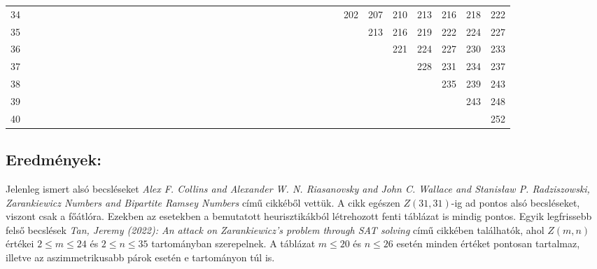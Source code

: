 \documentclass[12pt,a4paper]{article}
\begin{document}
\begin{center}
{\begin{tabular}{r|*{39}{c}}
34 &   &   &   &   &   &   &   &   &   &   &   &   &   &   &   &   &   &   &   &   &   &   &   &   &   &   &   &   &   &   &   &   & 202 & 207 & 210 & 213 & 216 & 218 & 222 \\
35 &   &   &   &   &   &   &   &   &   &   &   &   &   &   &   &   &   &   &   &   &   &   &   &   &   &   &   &   &   &   &   &   &   & 213 & 216 & 219 & 222 & 224 & 227 \\
36 &   &   &   &   &   &   &   &   &   &   &   &   &   &   &   &   &   &   &   &   &   &   &   &   &   &   &   &   &   &   &   &   &   &   & 221 & 224 & 227 & 230 & 233 \\
37 &   &   &   &   &   &   &   &   &   &   &   &   &   &   &   &   &   &   &   &   &   &   &   &   &   &   &   &   &   &   &   &   &   &   &   & 228 & 231 & 234 & 237 \\
38 &   &   &   &   &   &   &   &   &   &   &   &   &   &   &   &   &   &   &   &   &   &   &   &   &   &   &   &   &   &   &   &   &   &   &   &   & 235 & 239 & 243 \\
39 &   &   &   &   &   &   &   &   &   &   &   &   &   &   &   &   &   &   &   &   &   &   &   &   &   &   &   &   &   &   &   &   &   &   &   &   &   & 243 & 248 \\
40 &   &   &   &   &   &   &   &   &   &   &   &   &   &   &   &   &   &   &   &   &   &   &   &   &   &   &   &   &   &   &   &   &   &   &   &   &   &   & 252 \\
\end{tabular}
}
\vspace{1em}
\end{center}

\subsection*{Eredmények:}
Jelenleg ismert alsó becsléseket \textit{Alex F. Collins and Alexander W. N. Riasanovsky and John C. Wallace and Stanisław P. Radziszowski, Zarankiewicz Numbers and Bipartite Ramsey Numbers}\cite{collins2020zarankiewicz} című cikkéből vettük. A cikk egészen $Z(31,31)$-ig  ad pontos alsó becsléseket, viszont csak a főátlóra. Ezekben az esetekben a bemutatott heurisztikákból létrehozott fenti táblázat is mindig pontos. Egyik legfrissebb felső becslések \textit{Tan, Jeremy (2022): An attack on Zarankiewicz's problem through SAT solving} \cite{tan2022zarankiewicz} című cikkében találhatók, ahol $Z(m,n)$ értékei $2 \leq m \leq 24$ és $2 \leq n \leq 35$ tartományban szerepelnek. A táblázat $m \leq 20$ és $n \leq 26$ esetén minden értéket pontosan tartalmaz, illetve az aszimmetrikusabb párok esetén e tartományon túl is.
\end{document}
